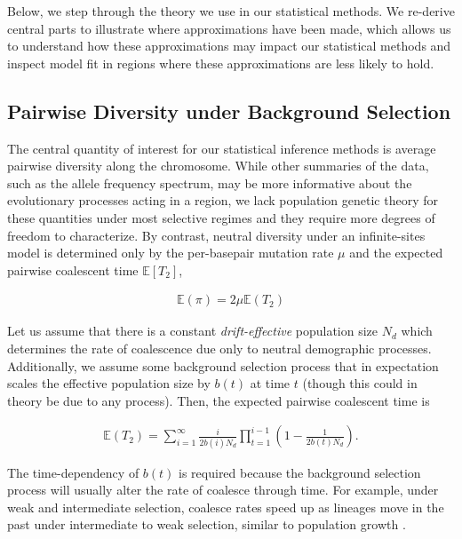 \documentclass[11pt]{article}
\newcommand{\E}{\mathbb{E}}
\begin{document}
Below, we step through the theory we use in our statistical methods. We
re-derive central parts to illustrate where approximations have been made,
which allows us to understand how these approximations may impact our
statistical methods and inspect model fit in regions where these approximations
are less likely to hold.

\subsection*{Pairwise Diversity under Background Selection}

The central quantity of interest for our statistical inference methods is
average pairwise diversity along the chromosome. While other summaries of the
data, such as the allele frequency spectrum, may be more informative about the
evolutionary processes acting in a region, we lack population genetic theory
for these quantities under most selective regimes and they require more degrees
of freedom to characterize. By contrast, neutral diversity under an
infinite-sites model is determined only by the per-basepair mutation rate $\mu$
and the expected pairwise coalescent time $\E[T_2]$,

\begin{align}
  \E(\pi) = 2 \mu \E(T_2)
\end{align}

Let us assume that there is a constant \emph{drift-effective} population size
$N_d$ which determines the rate of coalescence due only to neutral demographic
processes. Additionally, we assume some background selection process that in
expectation scales the effective population size by $b(t)$ at time $t$ (though
this could in theory be due to any process). Then, the expected pairwise
coalescent time is

\begin{align}
  \label{eq:T_2}
  \E(T_2) = \sum_{i=1}^\infty \frac{i}{2 b(i) N_d}\prod_{t=1}^{i-1} \left(1-\frac{1}{2 b(t) N_d}\right).
\end{align}

The time-dependency of $b(t)$ is required because the background selection
process will usually alter the rate of coalesce through time. For example,
under weak and intermediate selection, coalesce rates speed up as lineages move
in the past under intermediate to weak selection, similar to population growth
\parencite{Walczak2012-fi,Seger2010-rs,Good2014-yz}. 

\end{document}

